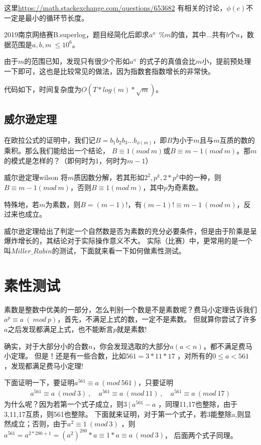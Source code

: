 这里\href{https://math.stackexchange.com/questions/653682}{https://math.stackexchange.com/questions/653682}
有相关的讨论，$\phi(c)$不一定是最小的循环节长度。

\begin{example}
2019南京网络赛B.superlog，题目经简化后即求$a^{a^{...}} \% m$的值，其中$...$共有$b$个$a$，数据范围是$a,b,m\ \le 10^6$。
\end{example}

由于$m$的范围已知，发现只有很少个形如$a^{a^{...}}$的式子的真值会比$m$小，提前预处理一下即可，这也是比较常见的做法，因为指数套指数增长的非常快。

代码如下，时间复杂度为$O(T*log(m)*\sqrt{m})$。




\subsection{威尔逊定理}
在欧拉公式的证明中，我们记$B=b_1b_2b_3...b_{\phi(m)}$，即$B$为小于$m$且与$m$互质的数的乘积。那么我们能给出一个结论，
$B\equiv 1(mod\ m)$或$B\equiv m-1(mod\ m)$。那$m$的模式是怎样的？（即何时为$1$，何时为$m-1$）

\begin{theorem}{威尔逊定理}{wilson}
	将$m$质因数分解，若其形如$2^2,p^k, 2*p^k$中的一种，则$B\equiv m-1(mod\ m)$，否则$B\equiv 1(mod\ m)$，其中$p$为奇素数。
	
	特殊地，若$m$为素数，则$B=(m-1)!$，有$(m-1)! \equiv m-1 \ (mod\ m)$，反过来也成立。
\end{theorem}

威尔逊定理给出了判定一个{\heiti 自然数是否为素数}的充分必要条件，但是由于阶乘是呈爆炸增长的，其结论对于实际操作意义不大。
实际（比赛）中，更常用的是一个叫$Miller\_Rabin$的测试，下面就来看一下如何做素性测试。

\section{素性测试}
素数是整数中优美的一部分，怎么判别一个数是不是素数呢？费马小定理告诉我们$a^p\equiv a \  (\ mod \ p)$，首先，不满足上式的数，一定不是素数。
但就算你尝试了许多$a$之后发现都满足上式，也不能断言$p$就是素数!

确实，对于大部分小的合数$n$，你会发现选取的大部分$a(a<n)$，都不满足费马小定理。
但是！还是有一些合数，比如$561=3*11*17$ ，对所有的$0\leq a < 561$ ，发现都满足费马小定理!

下面证明一下，要证明$a^{561}\equiv a\  (mod \ 561)$，只要证明
\begin{align*}
a^{561}\equiv a\  (mod  \ 3) \ ,\quad a^{561}\equiv a\  (mod  \ 11) \  ,\quad  a^{561}\equiv a\  (mod  \ 17)
\end{align*}
为什么呢？因为若第一个式子成立，则$3 \ |\  a^{561}-a$  ，同理11,17也整除，由于3,11,17互质，则561也整除。
下面就来证明，对于第一个式子，若3能整除a,则显然成立；否则，由于$a^2\equiv 1\ (mod \ 3)$  ，则$a^{561}=a^{2*280+1}=(a^2)^{280}*a\equiv 1*a \equiv  a  \ (mod \ 3)$，
后面两个式子同理。

